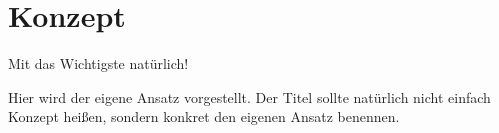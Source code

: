 
\chapter{Konzept}
  \label{Konzept}

Mit das Wichtigste natürlich!

Hier wird der eigene Ansatz vorgestellt. Der Titel sollte natürlich nicht einfach Konzept heißen, sondern konkret den eigenen Ansatz benennen.


